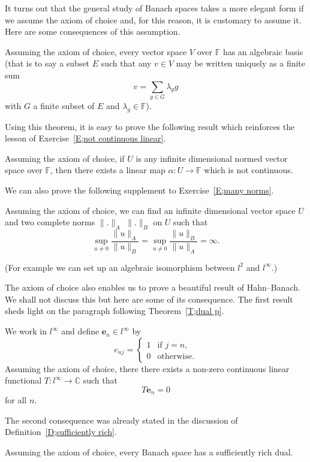 It turns out that the general study of Banach spaces
takes a more elegant form if we assume the
axiom of choice and, for this reason, it is customary
to assume it. Here are some consequences of this assumption.
\begin{theorem}\label{T;basis} 
Assuming the axiom of choice, every vector
space $V$ over  ${\mathbb F}$ has an algebraic basis 
(that is to say a subset $E$ such that any $v\in V$ may be written
uniquely as a finite sum
\[v=\sum_{g\in G}\lambda_{g}g\]
with $G$ a finite subset of $E$ and $\lambda_{g}\in{\mathbb F}$).
\end{theorem}   
Using this theorem, it is easy to prove the following result which
reinforces the lesson of Exercise~\ref{E;not continuous linear}.
\begin{theorem} Assuming the axiom of choice,
if $U$ is any infinite dimensional normed vector space
over  ${\mathbb F}$, then there exists a linear map
$\alpha:U\rightarrow{\mathbb F}$ which is not continuous.
\end{theorem}
We can also prove the following supplement to
Exercise~\ref{E;many norms}.
\begin{theorem} Assuming the axiom of choice,
we can find an infinite dimensional vector space
$U$ and two complete norms $\|.\|_{A}$ $\|.\|_{B}$
on $U$ such that
\[\sup_{u\neq 0}\frac{\|u\|_{A}}{\|u\|_{B}}
=\sup_{u\neq 0}\frac{\|u\|_{B}}{\|u\|_{A}}=\infty.\]
\end{theorem} 
(For example we can set up an algebraic isomorphism 
between $l^{2}$ and $l^{\infty}$.)

The axiom of choice also enables us to prove a beautiful
result of Hahn--Banach. We shall not discuss this but
here are some of its consequence. The first result
sheds light on the paragraph following
Theorem~\ref{T;dual p}.
\begin{lemma}\label{L;big dual} 
We work in $l^{\infty}$ and define 
${\mathbf e}_{n}\in l^{\infty}$ by
\[e_{nj}= 
\begin{cases}
1&\text{if $j=n$,}\\
0&\text{otherwise.}
\end{cases}
\]
Assuming the axiom of choice,
there there exists a non-zero continuous linear functional
$T:l^{\infty}\rightarrow{\mathbb C}$ such that
\[T{\mathbf e}_{n}=0\]
for all $n$.
\end{lemma} 
The second consequence was already stated in the discussion
of Definition~\ref{D;sufficiently rich}.
\begin{theorem} Assuming the axiom of choice, every Banach
space has a sufficiently rich dual.
\end{theorem}

